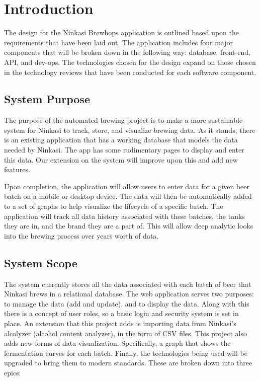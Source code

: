\section{Introduction}

The design for the Ninkasi Brewhops application is outlined based upon the requirements that have been laid out. The application includes four major components that will be broken down in the following way: database, front-end, API, and dev-ops. The technologies chosen for the design expand on those chosen in the technology reviews that have been conducted for each software component.

    \subsection{System Purpose}

    The purpose of the automated brewing project is to make a more sustainable system for Ninkasi to track, store, and visualize brewing data.  As it stands, there is an existing application that has a working database that models the data needed by Ninkasi. The app has some rudimentary pages to display and enter this data.  Our extension on the system will improve upon this and add new features.
    
    Upon completion, the application will allow users to enter data for a given beer batch on a mobile or desktop device. The data will then be automatically added to a set of graphs to help visualize the lifecycle of a specific batch. The application will track all data history associated with these batches, the tanks they are in, and the brand they are a part of. This will allow deep analytic looks into the brewing process over years worth of data.
    
    \subsection{System Scope}
    
    The system currently stores all the data associated with each batch of beer that Ninkasi brews in a relational database.  The web application serves two purposes: to manage the data (add and update), and to display the data.  Along with this there is a concept of user roles, so a basic login and security system is set in place.  An extension that this project adds is importing data from Ninkasi's alcolyzer (alcohol content analyzer), in the form of CSV files.  This project also adds new forms of data visualization.  Specifically, a graph that shows the fermentation curves for each batch. Finally, the technologies being used will be upgraded to bring them to modern standards.  These are broken down into three epics:
    
